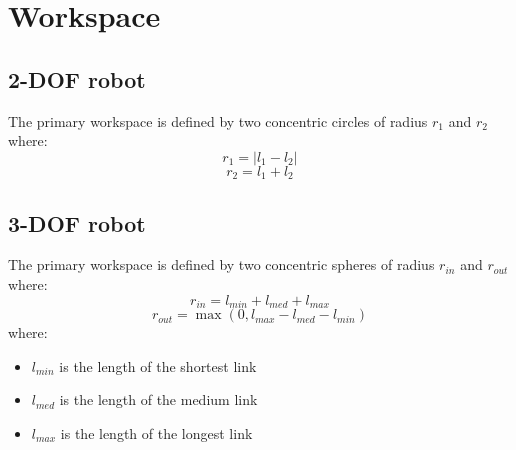 \documentclass[11pt]{article}
\begin{document}
\section{Workspace}
\subsection{2-DOF robot}
The primary workspace is defined by two concentric circles of radius $r_1$ and $r_2$ where:
\begin{equation}
  r_1 = |l_1 - l_2|
\end{equation}
\begin{equation}
  r_2 = l_1 + l_2
\end{equation}
\subsection{3-DOF robot}
The primary workspace is defined by two concentric spheres of radius $r_{in}$ and $r_{out}$ where:
\begin{equation}
  r_{in}= l_{min}+l_{med}+l_{max}
\end{equation}
\begin{equation}
  r_{out} = \max(0,l_{max}- l_{med} -l_{min})
\end{equation}
where:
\begin{itemize}
  \item $l_{min}$ is the length of the shortest link
  \item $l_{med}$ is the length of the medium link
  \item $l_{max}$ is the length of the longest link
\end{itemize}
\end{document}
